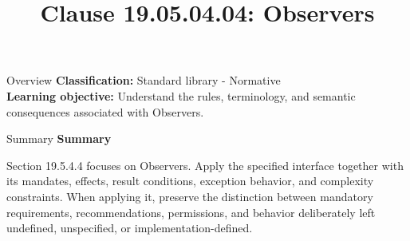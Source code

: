 \documentclass[10pt,letterpaper]{article}
\title{Clause 19.05.04.04: Observers}
\author{}
\date{}
\begin{document}
\maketitle
\begin{CornellOverviewBox}{Overview}
\textbf{Classification:} Standard library - Normative\\[2pt]
\textbf{Learning objective:} Understand the rules, terminology, and semantic consequences associated with Observers.
\end{CornellOverviewBox}\begin{CornellSummaryBox}{Summary}
{\sffamily\bfseries\color{Accent} Summary}\par\vspace{3pt}Section 19.5.4.4 focuses on Observers. Apply the specified interface together with its mandates, effects, result conditions, exception behavior, and complexity constraints. When applying it, preserve the distinction between mandatory requirements, recommendations, permissions, and behavior deliberately left undefined, unspecified, or implementation-defined.
\end{CornellSummaryBox}
\end{document}
